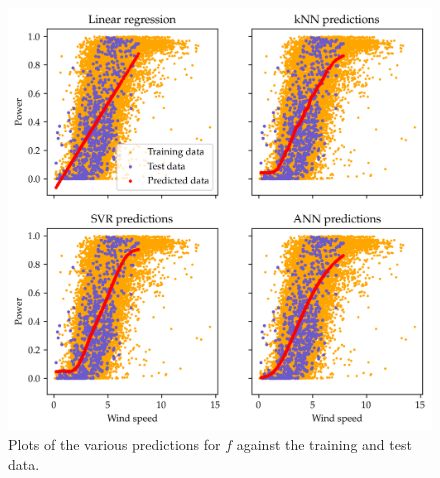 \documentclass[11pt]{article}
\begin{document}
\begin{center}
\end{center}

\begin{figure}
  \centering
  \includegraphics{figures/q1_prediction_plots.png}
  \caption{Plots of the various predictions for $f$ against the training and test data.}
  \label{fig:q1-prediction-plots}
\end{figure}
\end{document}
